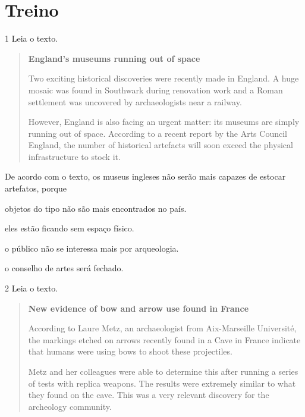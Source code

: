 
\section{Treino}

\num{1} Leia o texto.

\begin{quote}
\textbf{England's museums running out of space}

Two exciting historical discoveries were recently made in England. A huge mosaic was found in Southwark during renovation work and a Roman settlement was uncovered by archaeologists near a railway.

However, England is also facing an urgent matter: its museums are simply running out of space. According to a recent report by the Arts
Council England, the number of historical artefacts will soon exceed the physical infrastructure to stock it. 

\end{quote}

De acordo com o texto, os museus ingleses não serão mais capazes de
estocar artefatos, porque

\begin{escolha}
\item objetos do tipo não são mais encontrados no país.

\item eles estão ficando sem espaço físico.

\item o público não se interessa mais por arqueologia.

\item o conselho de artes será fechado.
\end{escolha}

\num{2} Leia o texto.

\begin{quote}
\textbf{New evidence of bow and arrow use found in France}

According to Laure Metz, an archaeologist from Aix-Marseille Université, the markings etched on arrows recently found in a Cave in France indicate that humans were using bows to shoot these projectiles.

Metz and her colleagues were able to determine this after running a series of tests with replica weapons. The results were extremely similar to what they found on the cave. This was a very relevant discovery for the archeology community.   

\end{quote}

